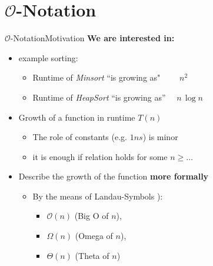 
\section{\texorpdfstring{$\mathcal{O}$}{O}-Notation}


\begin{frame}{$\mathcal{O}$-Notation}{Motivation}
  \textbf{We are interested in:}
  \begin{itemize}
  \item example sorting:
    \begin{itemize}
      \item
        Runtime of \textit{Minsort} ``is growing as" $\quad{}\quad{}n^2$
      \item
         Runtime of \textit{HeapSort} ``is growing as'' $\quad{}n \, \log n$
    \end{itemize}
    \item<2->
      Growth of a function in runtime $T(n)$
      \begin{itemize}
      \item The role of constants (e.g. $1ns$) is minor
      \item it is enough if relation holds for some $n\geq \ldots$
      \end{itemize}
    \item<3->
      Describe the growth of the function \textbf{more formally}
    \begin{itemize}
      \item
        By the means of Landau-Symbols \cite{wikipedia_big_o_notation}):
            \begin{itemize}
                \item
                    {\color{Mittel-Blau}$\mathcal{O}(n)$} (Big O of $n$),
                \item
                    {\color{Mittel-Blau}$\Omega (n)$} (Omega of $n$),
                \item
                    {\color{Mittel-Blau}$\Theta (n)$} (Theta of $n$)
            \end{itemize}
    \end{itemize}
  \end{itemize}
\end{frame}

